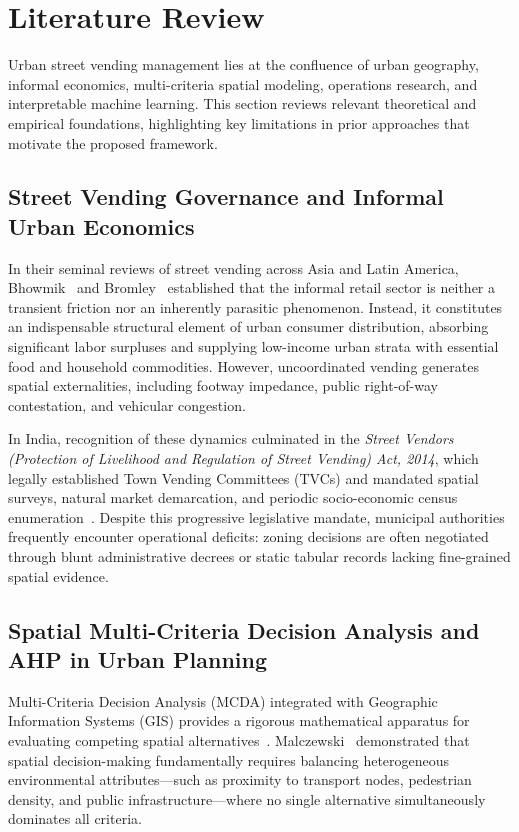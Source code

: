 \section{Literature Review}
\label{sec:literature_review}

Urban street vending management lies at the confluence of urban geography, informal economics, multi-criteria spatial modeling, operations research, and interpretable machine learning. This section reviews relevant theoretical and empirical foundations, highlighting key limitations in prior approaches that motivate the proposed framework.

\subsection{Street Vending Governance and Informal Urban Economics}
\label{sec:lit_vending}

In their seminal reviews of street vending across Asia and Latin America, Bhowmik~\cite{bhowmik2005street} and Bromley~\cite{bromley2000street} established that the informal retail sector is neither a transient friction nor an inherently parasitic phenomenon. Instead, it constitutes an indispensable structural element of urban consumer distribution, absorbing significant labor surpluses and supplying low-income urban strata with essential food and household commodities. However, uncoordinated vending generates spatial externalities, including footway impedance, public right-of-way contestation, and vehicular congestion. 

In India, recognition of these dynamics culminated in the \textit{Street Vendors (Protection of Livelihood and Regulation of Street Vending) Act, 2014}, which legally established Town Vending Committees (TVCs) and mandated spatial surveys, natural market demarcation, and periodic socio-economic census enumeration~\cite{india2014street}. Despite this progressive legislative mandate, municipal authorities frequently encounter operational deficits: zoning decisions are often negotiated through blunt administrative decrees or static tabular records lacking fine-grained spatial evidence.

\subsection{Spatial Multi-Criteria Decision Analysis and AHP in Urban Planning}
\label{sec:lit_mcda}

Multi-Criteria Decision Analysis (MCDA) integrated with Geographic Information Systems (GIS) provides a rigorous mathematical apparatus for evaluating competing spatial alternatives~\cite{malczewski1999gis}. Malczewski~\cite{malczewski2006ordered} demonstrated that spatial decision-making fundamentally requires balancing heterogeneous environmental attributes—such as proximity to transport nodes, pedestrian density, and public infrastructure—where no single alternative simultaneously dominates all criteria.

